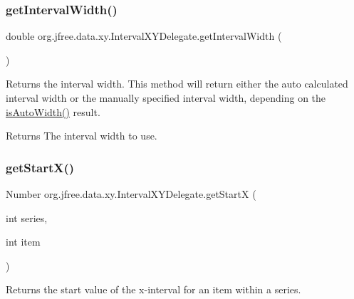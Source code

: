 \subsubsection{\texorpdfstring{get\+Interval\+Width()}{getIntervalWidth()}}
{\footnotesize\ttfamily double org.\+jfree.\+data.\+xy.\+Interval\+X\+Y\+Delegate.\+get\+Interval\+Width (\begin{DoxyParamCaption}{ }\end{DoxyParamCaption})}

Returns the interval width. This method will return either the auto calculated interval width or the manually specified interval width, depending on the \mbox{\hyperlink{classorg_1_1jfree_1_1data_1_1xy_1_1_interval_x_y_delegate_ab44b13f9cd61ebc7b2ed8741bea98b1d}{is\+Auto\+Width()}} result.

\begin{DoxyReturn}{Returns}
The interval width to use. 
\end{DoxyReturn}
\mbox{\label{classorg_1_1jfree_1_1data_1_1xy_1_1_interval_x_y_delegate_a2589d4e95e8ddaa401af12826572982d}} 
\subsubsection{\texorpdfstring{get\+Start\+X()}{getStartX()}}
{\footnotesize\ttfamily Number org.\+jfree.\+data.\+xy.\+Interval\+X\+Y\+Delegate.\+get\+StartX (\begin{DoxyParamCaption}\item[{int}]{series,  }\item[{int}]{item }\end{DoxyParamCaption})}

Returns the start value of the x-\/interval for an item within a series.


